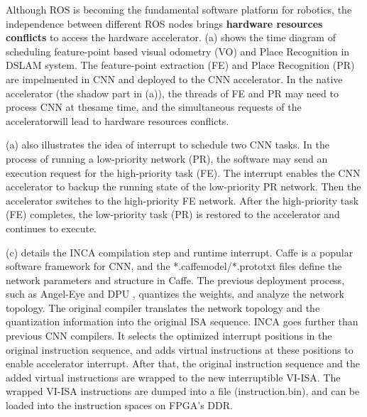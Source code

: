 



 Although ROS is becoming the fundamental software platform for robotics, the independence between different ROS nodes brings \textbf{hardware resources conflicts} to access the hardware accelerator. (a) shows the time diagram of scheduling feature-point based visual odometry (VO) and Place Recognition in DSLAM system. The feature-point extraction (FE) and Place Recognition (PR) are impelmented in CNN and deployed to the CNN accelerator. In the native accelerator (the shadow part in (a)), the threads of FE and PR may need to process CNN at thesame time, and the simultaneous requests of the acceleratorwill lead to hardware resources conflicts. 

(a) also illustrates the idea of interrupt to schedule two CNN tasks. In the process of running a low-priority network (PR), the software may send an execution request for the high-priority task (FE). The interrupt enables the CNN accelerator to backup the running state of the low-priority PR network. Then the accelerator switches to the high-priority FE network. After the high-priority task (FE) completes, the low-priority task (PR) is restored to the accelerator and continues to execute.


(c) details the INCA compilation step and runtime interrupt. Caffe \cite{jia2014caffe} is a popular software framework for CNN, and the *.caffemodel/*.prototxt files define the network parameters and structure in Caffe. The previous deployment process, such as Angel-Eye \cite{guo2017angel} and DPU \cite{dpu}, quantizes the weights, and analyze the network topology. The original compiler translates the network topology and the quantization information into the original ISA sequence. INCA goes further than previous CNN compilers. It selects the optimized interrupt positions in the original instruction sequence, and adds virtual instructions at these positions to enable accelerator interrupt. After that, the original instruction sequence and the added virtual instructions are wrapped to the new interruptible VI-ISA. The wrapped VI-ISA instructions are dumped into a file (instruction.bin), and can be loaded into the instruction spaces on FPGA's DDR.


